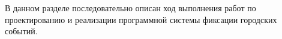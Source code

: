 В данном разделе последовательно описан ход выполнения работ по проектированию и реализации программной системы фиксации городских событий.






